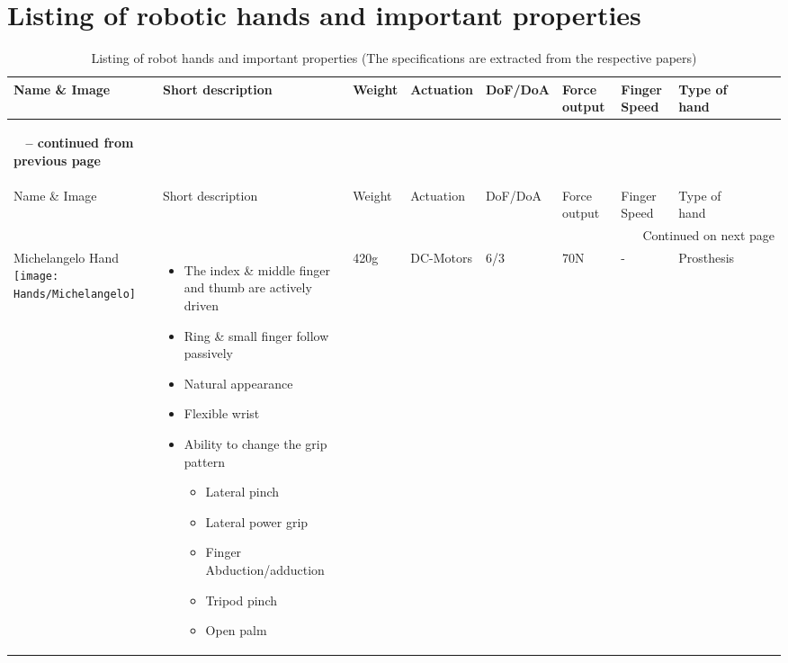 \documentclass[main]{subfiles}
\begin{document}
\chapter{Listing of robotic hands and important properties} %

\label{AppendixB} %

\scriptsize
\setlength{\LTleft}{-70pt}%
\setlength{\LTright}{\LTleft}
\begin{longtable}{@{}p{6cm}p{4cm}p{0.7cm}p{1.2cm}p{1cm}p{1cm}p{1cm}p{1cm}p{1cm}p{1cm}p{2cm}@{}} 
\caption[Listing of robot hands]{Listing of robot hands and important properties}\\
\toprule
Name \& Image & Short description & Weight & Actuation & DoF/DoA & Force output & Finger Speed & Type of hand\\ 
\midrule
\label{robot-hand-listing}
\endfirsthead

\multicolumn{11}{p{8cm}}
{{\bfseries \tablename\ \thetable{} -- continued from previous page}}\\ 
\hline
Name \& Image & Short description & Weight & Actuation & DoF/DoA & Force output & Finger Speed & Type of hand\\ \midrule
\endhead

\hline \multicolumn{11}{r}{{Continued on next page}} \\ \hline 
\caption*{Listing of robot hands and important properties (The specifications are extracted from the respective papers)}\label{robot-hand-listing}
\endfoot
\endlastfoot

Michelangelo Hand \newline
\texttt{[image: Hands/Michelangelo]} & 
\begin{itemize}\itemsep0em
\item The index \& middle finger and thumb are actively driven 
\item Ring \& small finger follow passively
\item Natural appearance
\item Flexible wrist
\item Ability to change the grip pattern 
\begin{itemize}\itemsep0em
\item Lateral pinch
\item Lateral power grip
\item Finger Abduction/adduction
\item Tripod pinch
\item Open palm
\end{itemize}
\end{itemize} 
& 420g & DC-Motors & 6/3 & 70N & - & Prosthesis\\


\end{longtable}
\end{document}
